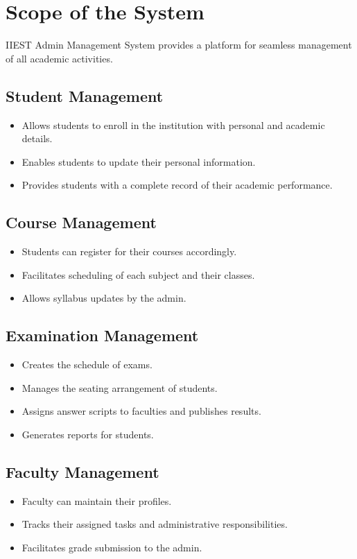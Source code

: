 \documentclass{scrreprt}
\begin{document}
\section{Scope of the System}
IIEST Admin Management System provides a platform for seamless management of all academic activities.

\subsection{Student Management}
\begin{itemize}
    \item Allows students to enroll in the institution with personal and academic details.
    \item Enables students to update their personal information.
    \item Provides students with a complete record of their academic performance.
\end{itemize}

\subsection{Course Management}
\begin{itemize}
    \item Students can register for their courses accordingly.
    \item Facilitates scheduling of each subject and their classes.
    \item Allows syllabus updates by the admin.
\end{itemize}

\subsection{Examination Management}
\begin{itemize}
    \item Creates the schedule of exams.
    \item Manages the seating arrangement of students.
    \item Assigns answer scripts to faculties and publishes results.
    \item Generates reports for students.
\end{itemize}

\subsection{Faculty Management}
\begin{itemize}
    \item Faculty can maintain their profiles.
    \item Tracks their assigned tasks and administrative responsibilities.
    \item Facilitates grade submission to the admin.
\end{itemize}
\end{document}
